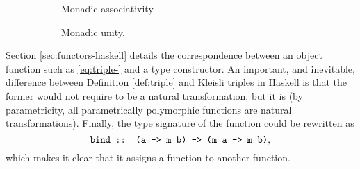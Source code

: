 \begin{figure}[htb]
  \begin{subfigure}[b]{0.5\linewidth}
    \begin{center}
    \end{center}
    \caption{Monadic associativity.}
    \label{fig:triple-associativity-haskell}
  \end{subfigure}
  \begin{subfigure}[b]{0.5\linewidth}
    \begin{center}
    \end{center}
    \caption{Monadic unity.}
    \label{fig:triple-unity-haskell}
  \end{subfigure}
  \caption{}
\end{figure}

Section \ref{sec:functors-haskell} details the correspondence between
an object function such as \eqref{eq:triple-} and a type constructor.
An important, and inevitable, difference between Definition
\ref{def:triple} and Kleisli triples in Haskell is that the former would not
require  to be a natural transformation, but it is
(by parametricity, all parametrically polymorphic functions are
natural transformations). Finally, the type signature of the
 function could be rewritten as
\begin{equation*}
  \text{\texttt{bind :: (a -> m b) -> (m a -> m b)}}
  \text{,}
\end{equation*}
which makes it clear that it assigns a function to another function.

